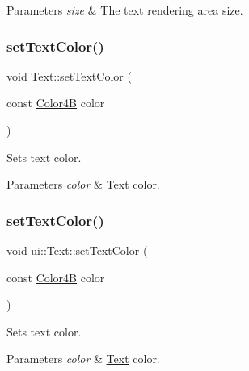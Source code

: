\begin{DoxyParams}{Parameters}
{\em size} & The text rendering area size. \\
\hline
\end{DoxyParams}
\mbox{\label{classui_1_1Text_aa81c41969f7e1b473c6a8dfc4dc22e55}} 
\subsubsection{\texorpdfstring{set\+Text\+Color()}{setTextColor()}\hspace{0.1cm}{\footnotesize\ttfamily [1/2]}}
{\footnotesize\ttfamily void Text\+::set\+Text\+Color (\begin{DoxyParamCaption}\item[{const \hyperlink{structColor4B}{Color4B}}]{color }\end{DoxyParamCaption})}

Sets text color.


\begin{DoxyParams}{Parameters}
{\em color} & \hyperlink{classui_1_1Text}{Text} color. \\
\hline
\end{DoxyParams}
\mbox{\label{classui_1_1Text_ac7643db4602dce42cd1f20e366761af6}} 
\subsubsection{\texorpdfstring{set\+Text\+Color()}{setTextColor()}\hspace{0.1cm}{\footnotesize\ttfamily [2/2]}}
{\footnotesize\ttfamily void ui\+::\+Text\+::set\+Text\+Color (\begin{DoxyParamCaption}\item[{const \hyperlink{structColor4B}{Color4B}}]{color }\end{DoxyParamCaption})}

Sets text color.


\begin{DoxyParams}{Parameters}
{\em color} & \hyperlink{classui_1_1Text}{Text} color. \\
\hline
\end{DoxyParams}
\mbox{\label{classui_1_1Text_ae76ef053948ec415d03827db39e6c483}} 
